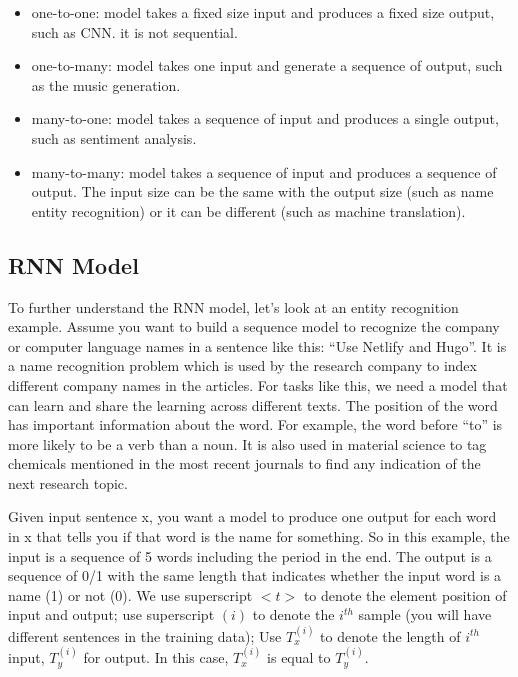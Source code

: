 \documentclass[
  12pt,
]{krantz}
\providecommand{\tightlist}{%
  \setlength{\itemsep}{0pt}\setlength{\parskip}{0pt}}
\begin{document}
\begin{itemize}
\tightlist
\item
  one-to-one: model takes a fixed size input and produces a fixed size output, such as CNN. it is not sequential.
\item
  one-to-many: model takes one input and generate a sequence of output, such as the music generation.
\item
  many-to-one: model takes a sequence of input and produces a single output, such as sentiment analysis.
\item
  many-to-many: model takes a sequence of input and produces a sequence of output. The input size can be the same with the output size (such as name entity recognition) or it can be different (such as machine translation).
\end{itemize}

\hypertarget{rnn-model}{%
\subsection{RNN Model}\label{rnn-model}}

To further understand the RNN model, let's look at an entity recognition example. Assume you want to build a sequence model to recognize the company or computer language names in a sentence like this: ``Use Netlify and Hugo''. It is a name recognition problem which is used by the research company to index different company names in the articles. For tasks like this, we need a model that can learn and share the learning across different texts. The position of the word has important information about the word. For example, the word before ``to'' is more likely to be a verb than a noun. It is also used in material science to tag chemicals mentioned in the most recent journals to find any indication of the next research topic.

Given input sentence x, you want a model to produce one output for each word in x that tells you if that word is the name for something. So in this example, the input is a sequence of 5 words including the period in the end. The output is a sequence of 0/1 with the same length that indicates whether the input word is a name (1) or not (0). We use superscript \(<t>\) to denote the element position of input and output; use superscript \((i)\) to denote the \(i^{th}\) sample (you will have different sentences in the training data); Use \(T_x^{(i)}\) to denote the length of \(i^{th}\) input, \(T_y^{(i)}\) for output. In this case, \(T_x^{(i)}\) is equal to \(T_y^{(i)}\).
\end{document}
